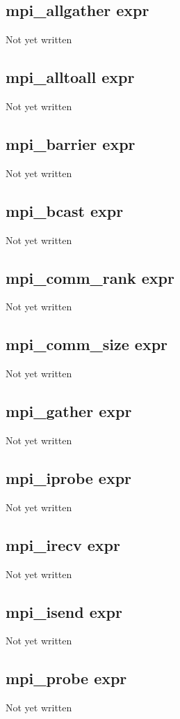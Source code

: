\documentclass[a4paper,11pt]{article}
\begin{document}
{\subsection{\ttfamily mpi\_allgather expr}
Not yet written

\subsection{\ttfamily mpi\_alltoall expr}
Not yet written

\subsection{\ttfamily mpi\_barrier expr}
Not yet written

\subsection{\ttfamily mpi\_bcast expr}
Not yet written

\subsection{\ttfamily mpi\_comm\_rank expr}
Not yet written

\subsection{\ttfamily mpi\_comm\_size expr}
Not yet written

\subsection{\ttfamily mpi\_gather expr}
Not yet written

\subsection{\ttfamily mpi\_iprobe expr}
Not yet written

\subsection{\ttfamily mpi\_irecv expr}
Not yet written

\subsection{\ttfamily mpi\_isend expr}
Not yet written

\subsection{\ttfamily mpi\_probe expr}
Not yet written

}
\end{document}
